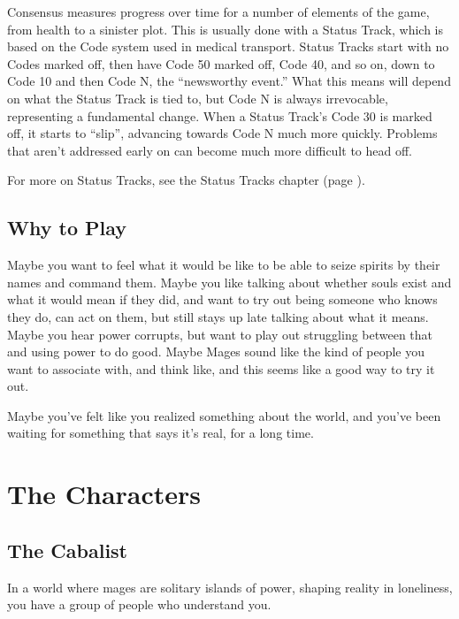 \documentclass[10pt,twoside,openright]{memoir}
\begin{document}
Consensus measures progress over time for a number of elements of the
game, from health to a sinister plot. This is usually done with a Status
Track, which is based on the Code system used in medical transport.
Status Tracks start with no Codes marked off, then have Code 50 marked
off, Code 40, and so on, down to Code 10 and then Code N, the
``newsworthy event.'' What this means will depend on what the Status
Track is tied to, but Code N is always irrevocable, representing a
fundamental change. When a Status Track's Code 30 is marked off, it
starts to ``slip'', advancing towards Code N much more quickly. Problems
that aren't addressed early on can become much more difficult to head
off.

For more on Status Tracks, see the Status Tracks chapter (page \pageref{Status Tracks chapter}).

\hypertarget{why-to-play}{%
\section{Why to Play}\label{why-to-play}}

Maybe you want to feel what it would be like to be able to seize spirits
by their names and command them. Maybe you like talking about whether
souls exist and what it would mean if they did, and want to try out
being someone who knows they do, can act on them, but still stays up
late talking about what it means. Maybe you hear power corrupts, but
want to play out struggling between that and using power to do good.
Maybe Mages sound like the kind of people you want to associate with,
and think like, and this seems like a good way to try it out.

Maybe you've felt like you realized something about the world, and
you've been waiting for something that says it's real, for a long time.

\newpage

\hypertarget{the-characters}{%
\chapter{The Characters}\label{the-characters}}

\hypertarget{the-cabalist}{%
\section{The Cabalist}\label{the-cabalist}}

In a world where mages are solitary islands of power, shaping reality in
loneliness, you have a group of people who understand you.
\end{document}
